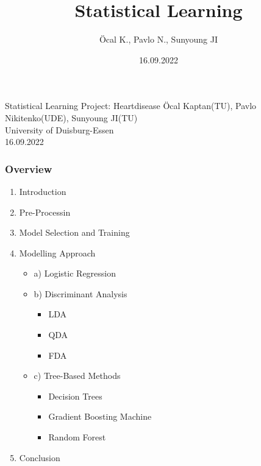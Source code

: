 \documentclass[xcolor=dvipsnames]{beamer}
\author{Öcal K., Pavlo N., Sunyoung JI}
\title{Statistical Learning}
\date{16.09.2022}
\newcommand{\testIt}[1][A text that can be changed locally\ldots]{Project: Heartdisease}
\begin{document}
\begin{frame}[plain]
\vspace{-0cm}
\begin{center}
\end{center}
\vfill\vfill
\begin{center}
{\Large Statistical Learning}
\vfill
{\large \testIt}
\vfill\vfill
{\large Öcal Kaptan(TU), Pavlo Nikitenko(UDE), Sunyoung JI(TU)}\\

{\small University of Duisburg-Essen}\\

{\small 16.09.2022}
\end{center}
\end{frame}\addtocounter{framenumber}

\begin{frame}
\frametitle{Overview}
\begin{enumerate}
\item Introduction
\item Pre-Processin
\item Model Selection and Training
\item Modelling Approach 
\begin{itemize}
\item a) Logistic Regression
\item b) Discriminant Analysis
\begin{itemize}
\item LDA
\item QDA
\item FDA
\end{itemize}
\item c) Tree-Based Methods
\begin{itemize}
\item Decision Trees
\item Gradient Boosting Machine
\item Random Forest
\end{itemize}
\end{itemize}
\item Conclusion
\end{enumerate}
\end{frame}
\end{document}

